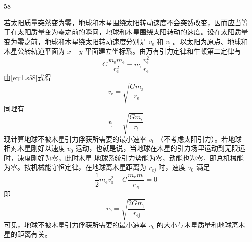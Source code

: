 \begin{solution}{58}
    \begin{subsolution}
        若太阳质量突然变为零，地球和木星围绕太阳转动速度不会突然改变，因而应当等于在太阳质量变为零之前的瞬间，地球和木星围绕太阳转动的速度。设在太阳质量变为零之前，地球和木星绕太阳转动速度分别是 $v_{\mathrm{e}}$ 和 $v_{\mathrm{j}}$ 。以太阳为原点、地球和木星公转轨道平面为 $x - y$ 平面建立坐标系。由万有引力定律和牛顿第二定律有
        \begin{equation}
            G \frac {m _ {\mathrm{s}} m _ {\mathrm{e}}}{r _ {\mathrm{e}}^{2}} = m _ {\mathrm{e}} \frac {v _ {\mathrm{e}}^{2}}{r _ {\mathrm{e}}}
            \label{eq:1.s58}
        \end{equation}
        由\eqref{eq:1.s58}式得
        \begin{equation}
            v _ {\mathrm{e}} = \sqrt {\frac {G m _ {\mathrm{s}}}{r _ {\mathrm{e}}}}
            \label{eq:2.s58}
        \end{equation}
        同理有
        \begin{equation}
            v _ {\mathrm{j}} = \sqrt {\frac {G m _ {\mathrm{s}}}{r _ {\mathrm{j}}}}
            \label{eq:3.s58}
        \end{equation}
        现计算地球不被木星引力俘获所需要的最小速率 $v_{0}$ （不考虑太阳引力）。若地球相对木星刚好以速度 $v_{0}$ 运动，也就是说，当地球在木星的引力场里运动到无限远时，速度刚好为零，此时木星-地球系统引力势能为零，动能也为零，即总机械能为零。按机械能守恒定律，在地球离木星距离为 $r_{ej}$ 时，速度 $v_{0}$ 满足
        \begin{equation}
            \frac {1}{2} m _ {\mathrm{e}} v _ {0}^{2} - G \frac {m _ {\mathrm{e}} m _ {\mathrm{j}}}{r _ {\mathrm{ej}}} = 0
            \label{eq:4.s58}
        \end{equation}
        即
        \begin{equation}
            v _ {0} = \sqrt {\frac {2 G m _ {\mathrm{j}}}{r _ {\mathrm{ej}}}}
            \label{eq:5.s58}
        \end{equation}
        可见，地球不被木星引力俘获所需要的最小速率 $v_{0}$ 的大小与木星质量和地球离木星的距离有关。


\end{subsolution}
\end{solution}
